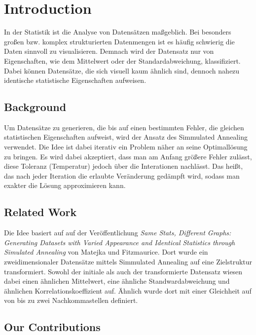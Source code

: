 \documentclass[sigconf]{acmart}
\begin{document}
\let\thefootnote\relax{}


\section{Introduction}

In der Statistik ist die Analyse von Datensätzen maßgeblich. Bei besonders großen bzw. komplex strukturierten Datenmengen ist es häufig schwierig die Daten sinnvoll zu visualisieren. Demnach wird der Datensatz nur von Eigenschaften, wie dem Mittelwert oder der Standardabweichung, klassifiziert. Dabei können Datensätze, die sich visuell kaum ähnlich sind, dennoch nahezu identische statistische Eigenschaften aufweisen. 

\subsection{Background}

Um Datensätze zu generieren, die bis auf einen bestimmten Fehler, die gleichen statistischen Eigenschaften aufweist, wird der Ansatz des Simmulated Annealing verwendet. Die Idee ist dabei iterativ ein Problem näher an seine Optimallösung zu bringen. Es wird dabei akzeptiert, dass man am Anfang größere Fehler zulässt, diese Toleranz (Temperatur) jedoch über die Interationen nachlässt. Das heißt, das nach jeder Iteration die erlaubte Veränderung gedämpft wird, sodass man exakter die Lösung approximieren kann.

\subsection{Related Work}

Die Idee basiert auf auf der Veröffentlichung \textit{Same Stats, Different Graphs: Generating Datasets with Varied Appearance and Identical Statistics through Simulated Annealing} von Matejka und Fitzmaurice. Dort wurde ein zweidimensionaler Datensätze mittels Simmulated Annealing auf eine Zielstruktur transformiert. Sowohl der initiale als auch der transformierte Datensatz wiesen dabei einen ähnlichen Mittelwert, eine ähnliche Standwardabweichung und ähnlichen Korrelationskoeffizient auf. Ähnlich wurde dort mit einer Gleichheit auf von bis zu zwei Nachkommastellen definiert.

\subsection{Our Contributions}
\end{document}
